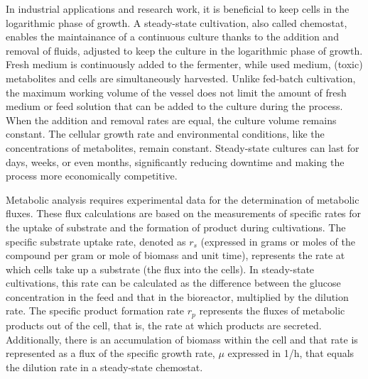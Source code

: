 In industrial applications and research work, it is beneficial to keep cells in the logarithmic phase of growth.
A steady-state cultivation, also called chemostat, enables the maintainance of a continuous 
culture thanks to the addition and removal of fluids, adjusted to keep the culture in the logarithmic phase of growth. \cite{2024Microbial} Fresh medium is continuously added to the fermenter, while used medium, (toxic) metabolites and cells are simultaneously harvested. Unlike fed-batch cultivation, the maximum working volume of the vessel does not limit the amount of fresh medium or feed solution that can be added to the culture during the process. When the addition and removal rates are equal, the culture volume remains constant. The cellular growth rate and environmental conditions, like the concentrations of metabolites, remain constant. Steady-state cultures can last for days, weeks, or even months, significantly reducing downtime and making the process more economically competitive. \cite{YangSha2019}

Metabolic analysis requires experimental data for the 
determination of metabolic fluxes. These flux calculations 
are based on the measurements of specific rates for the uptake of substrate and the formation of product during cultivations.
The specific substrate uptake rate, denoted as $r_s$ (expressed in grams or moles of the compound per gram or mole of biomass and unit time), represents the rate at which cells take up a substrate (the flux into the cells). In steady-state cultivations, this rate can be calculated as the difference between the glucose concentration in the feed and that in the bioreactor, multiplied by the dilution rate. The specific product formation rate $r_p$ represents the fluxes of metabolic products out of the cell, that is, the rate at which products are secreted. Additionally, there is an accumulation of biomass within the cell and that rate is represented as a flux of the specific growth rate, $\mu$ expressed in \unit{1/h}, that equals the dilution rate in a steady-state chemostat. \cite{Stephanopoulos1998}





